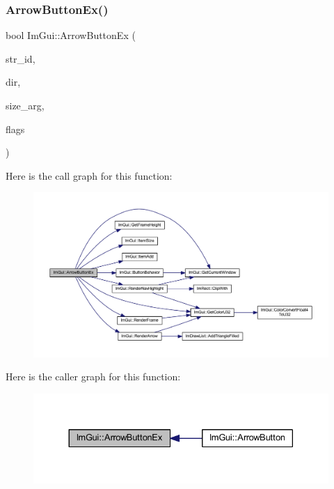 \subsubsection{\texorpdfstring{Arrow\+Button\+Ex()}{ArrowButtonEx()}}
{\footnotesize\ttfamily bool Im\+Gui\+::\+Arrow\+Button\+Ex (\begin{DoxyParamCaption}\item[{const char $\ast$}]{str\+\_\+id,  }\item[{\mbox{\hyperlink{imgui_8h_a874086389bc27cc9647118d22a806403}{Im\+Gui\+Dir}}}]{dir,  }\item[{\mbox{\hyperlink{struct_im_vec2}{Im\+Vec2}}}]{size\+\_\+arg,  }\item[{\mbox{\hyperlink{imgui__internal_8h_a990fae518aa1d95f571ee40989de4c22}{Im\+Gui\+Button\+Flags}}}]{flags }\end{DoxyParamCaption})}

Here is the call graph for this function\+:
\nopagebreak
\begin{figure}[H]
\begin{center}
\leavevmode
\includegraphics[width=350pt]{namespace_im_gui_af8efa3144c85104fbb0aa2e7bc6a6069_cgraph}
\end{center}
\end{figure}
Here is the caller graph for this function\+:
\nopagebreak
\begin{figure}[H]
\begin{center}
\leavevmode
\includegraphics[width=330pt]{namespace_im_gui_af8efa3144c85104fbb0aa2e7bc6a6069_icgraph}
\end{center}
\end{figure}
\mbox{\label{namespace_im_gui_a581e58db0bc930bafa4a5d23093a2b99}} 
